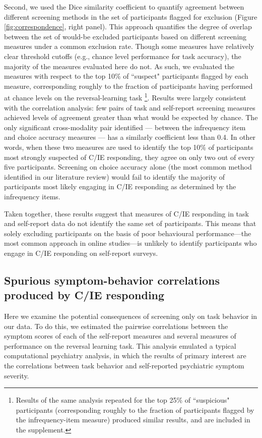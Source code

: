\documentclass[a4paper,notitlepage,12pt]{article}
\begin{document}
Second, we used the Dice similarity coefficient to quantify agreement between different screening methods in the set of participants flagged for exclusion (Figure \ref{fig:correspondence}, right panel). This approach quantifies the degree of overlap between the set of would-be excluded participants based on different screening measures under a common exclusion rate. Though some measures have relatively clear threshold cutoffs (e.g., chance level performance for task accuracy), the majority of the measures evaluated here do not. As such, we evaluated the measures with respect to the top 10\% of ``suspect" participants flagged by each measure, corresponding roughly to the fraction of participants having performed at chance levels on the reversal-learning task \footnote{Results of the same analysis repeated for the top 25\% of ``suspicious" participants (corresponding roughly to the fraction of participants flagged by the infrequency-item measure) produced similar results, and are included in the supplement.}. Results were largely consistent with the correlation analysis: few pairs of task and self-report screening measures achieved levels of agreement greater than what would be expected by chance. The only significant cross-modality pair identified --- between the infrequency item and choice accuracy measures --- has a similarly coefficient less than 0.4. In other words, when these two measures are used to identify the top 10\% of participants most strongly suspected of C/IE responding, they agree on only two out of every five participants. Screening on choice accuracy alone (the most common method identified in our literature review) would fail to identify the majority of participants most likely engaging in C/IE responding as determined by the infrequency items.

Taken together, these results suggest that measures of C/IE responding in task and self-report data do not identify the same set of participants. This means that solely excluding participants on the basis of poor behavioural performance---the most common approach in online studies---is unlikely to identify participants who engage in C/IE responding on self-report surveys. 

\subsection{Spurious symptom-behavior correlations produced by C/IE responding}

Here we examine the potential consequences of screening only on task behavior in our data. To do this, we estimated the pairwise correlations between the symptom scores of each of the self-report measures and several measures of performance on the reversal learning task. This analysis emulated a typical computational psychiatry analysis, in which the results of primary interest are the correlations between task behavior and self-reported psychiatric symptom severity.
\end{document}
